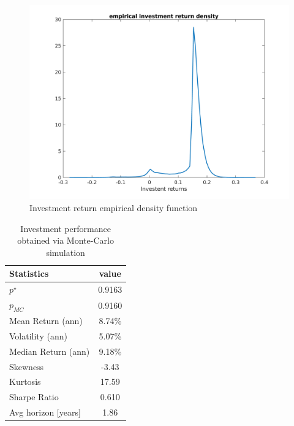 \begin{figure}[h]
	\includegraphics[scale = 0.5]{Images/Densityext1}
	\caption{Investment return empirical density function}
\end{figure}
\begin{table}
		\begin{tabular}{@{}lc@{}}
			\toprule
			Statistics & value  \\
			\midrule
			$p^{\star}$ & 0.9163\\
			\addlinespace[0.5em]	
			$p_{MC}$ & 0.9160\\
			\addlinespace[0.5em]
			Mean Return (ann) & 8.74\%\\
			\addlinespace[0.5em]
			Volatility (ann) & 5.07\%\\
			\addlinespace[0.5em]
			Median Return (ann) & 9.18\%\\
			\addlinespace[0.5em]
			Skewness & -3.43\\
			\addlinespace[0.5em]
			Kurtosis & 17.59\\
			\addlinespace[0.5em]
			Sharpe Ratio & 0.610\\
			\addlinespace[0.5em]
			Avg horizon [years] & 1.86 \\	
			\bottomrule
		\end{tabular}
		\caption{Investment performance obtained via Monte-Carlo simulation}
		\label{tab:performance_ext1}
\end{table}

